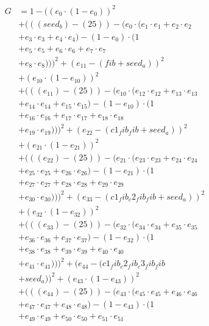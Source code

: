 \documentclass[10pt, a4paper]{article}
\begin{document}
\begin{small}
\begin{align*}
G &= 1 - ((e_{0} \cdot (1 - e_{0}))^{2} \\
& + (((seed_b) - (25)) - (e_{0} \cdot (e_{1} \cdot e_{1} + e_{2} \cdot e_{2} \\
& + e_{3} \cdot e_{3} + e_{4} \cdot e_{4}) - (1 - e_{0}) \cdot (1 \\
& + e_{5} \cdot e_{5} + e_{6} \cdot e_{6} + e_{7} \cdot e_{7} \\
& + e_{8} \cdot e_{8})))^{2} + (e_{11} - (fib + seed_a))^{2} \\
& + (e_{10} \cdot (1 - e_{10}))^{2} \\
& + (((e_{11}) - (25)) - (e_{10} \cdot (e_{12} \cdot e_{12} + e_{13} \cdot e_{13} \\
& + e_{14} \cdot e_{14} + e_{15} \cdot e_{15}) - (1 - e_{10}) \cdot (1 \\
& + e_{16} \cdot e_{16} + e_{17} \cdot e_{17} + e_{18} \cdot e_{18} \\
& + e_{19} \cdot e_{19})))^{2} + (e_{22} - (c1_fib_fib + seed_a))^{2} \\
& + (e_{21} \cdot (1 - e_{21}))^{2} \\
& + (((e_{22}) - (25)) - (e_{21} \cdot (e_{23} \cdot e_{23} + e_{24} \cdot e_{24} \\
& + e_{25} \cdot e_{25} + e_{26} \cdot e_{26}) - (1 - e_{21}) \cdot (1 \\
& + e_{27} \cdot e_{27} + e_{28} \cdot e_{28} + e_{29} \cdot e_{29} \\
& + e_{30} \cdot e_{30})))^{2} + (e_{33} - (c1_fib_c2_fib_fib + seed_a))^{2} \\
& + (e_{32} \cdot (1 - e_{32}))^{2} \\
& + (((e_{33}) - (25)) - (e_{32} \cdot (e_{34} \cdot e_{34} + e_{35} \cdot e_{35} \\
& + e_{36} \cdot e_{36} + e_{37} \cdot e_{37}) - (1 - e_{32}) \cdot (1 \\
& + e_{38} \cdot e_{38} + e_{39} \cdot e_{39} + e_{40} \cdot e_{40} \\
& + e_{41} \cdot e_{41})))^{2} + (e_{44} - (c1_fib_c2_fib_c3_fib_fib \\
& + seed_a))^{2} + (e_{43} \cdot (1 - e_{43}))^{2} \\
& + (((e_{44}) - (25)) - (e_{43} \cdot (e_{45} \cdot e_{45} + e_{46} \cdot e_{46} \\
& + e_{47} \cdot e_{47} + e_{48} \cdot e_{48}) - (1 - e_{43}) \cdot (1 \\
& + e_{49} \cdot e_{49} + e_{50} \cdot e_{50} + e_{51} \cdot e_{51} \\

\end{align*}
\end{small}
\end{document}
